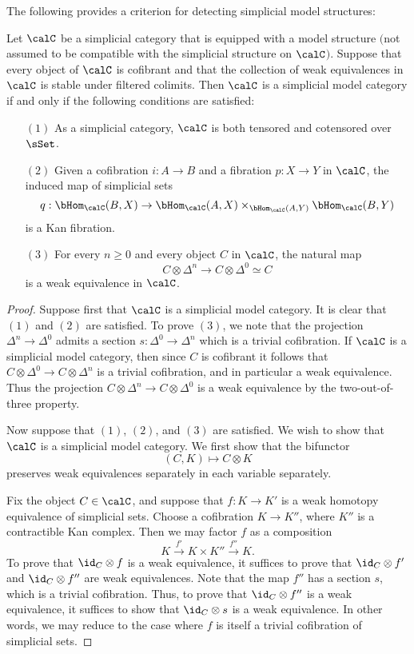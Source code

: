\begin{Simplicial Categories}
The following provides a criterion for detecting simplicial model structures:

\begin{proposition}\label{testsimpmodel}
Let $\calC$ be a simplicial category that is equipped with a model structure $($not assumed to be compatible with the simplicial structure on $\calC$$)$. Suppose that every object of $\calC$ is cofibrant  and that the collection of weak equivalences in $\calC$ is stable under filtered colimits. Then $\calC$ is a simplicial model category if and only if the following conditions are satisfied:

\begin{itemize}
\item[$(1)$] As a simplicial category, $\calC$ is both tensored and cotensored over $\sSet$. 
\item[$(2)$] Given a cofibration $i: A \rightarrow B$ and a fibration $p: X \rightarrow Y$ in $\calC$, the induced map of simplicial sets
$$ q: \bHom_{\calC}(B, X) \rightarrow \bHom_{\calC}(A,X) \times_{ \bHom_{\calC}(A,Y)} \bHom_{\calC}(B,Y) $$
is a Kan fibration. 
\item[$(3)$] For every $n \geq 0$ and every object $C$ in $\calC$, the natural map
$$ C \otimes \Delta^n \rightarrow C \otimes \Delta^0 \simeq C$$
is a weak equivalence in $\calC$.
\end{itemize}
\end{proposition}

\begin{proof}
Suppose first that $\calC$ is a simplicial model category. It is clear that $(1)$ and $(2)$ are satisfied. To prove $(3)$, we note that the projection $\Delta^n \rightarrow \Delta^0$ admits a section $s: \Delta^0 \rightarrow \Delta^n$ which is a trivial cofibration. If $\calC$ is a simplicial model category, then since $C$ is cofibrant it follows
that $C \otimes \Delta^0 \rightarrow C \otimes \Delta^n$ is a trivial cofibration, and in particular a weak equivalence. Thus the projection
$C \otimes \Delta^n \rightarrow C \otimes \Delta^0$ is a weak equivalence by the two-out-of-three property.

Now suppose that $(1)$, $(2)$, and $(3)$ are satisfied. We wish to show that $\calC$ is a simplicial model category. 
We first show that the bifunctor
$$ (C,K) \mapsto C \otimes K$$
preserves weak equivalences separately in each variable separately.

Fix the object $C \in \calC$, and suppose that $f: K \rightarrow K'$ is a weak homotopy equivalence of simplicial sets. Choose a cofibration $K \rightarrow K''$, where $K''$ is a contractible Kan complex. Then we may factor $f$ as a composition
$$ K \stackrel{f'}{\rightarrow} K \times K'' \stackrel{f''}{\rightarrow} K.$$
To prove that $\id_{C} \otimes f$ is a weak equivalence, it suffices to prove that
$\id_{C} \otimes f'$ and $\id_{C} \otimes f''$ are weak equivalences. Note that the map
$f''$ has a section $s$, which is a trivial cofibration. Thus, to prove that $\id_{C} \otimes f''$ is a weak equivalence, it suffices to show that $\id_{C} \otimes s$ is a weak equivalence. In other words, we may reduce to the case where $f$ is itself a trivial cofibration of simplicial sets.


\end{proof}
\end{Simplicial Categories}
